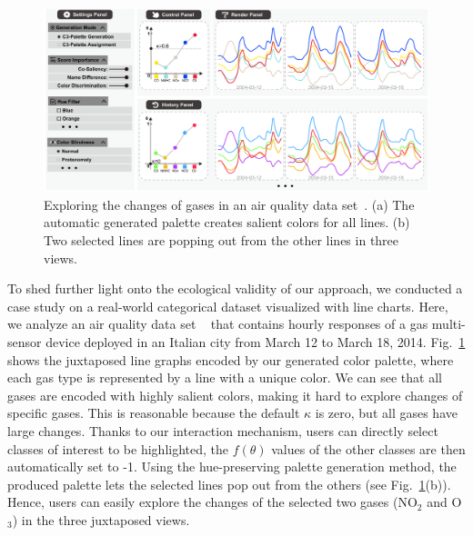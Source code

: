 \begin{figure}[!t]
\centering
\includegraphics[width=1\linewidth]{figures/case-linechart-2.pdf}
\caption{Exploring the changes of gases in an air quality data set~\cite{DEVITO2008750}. (a) The automatic generated palette creates salient colors for  all lines. (b) Two selected lines are popping out from the other lines in three views.}
\vspace*{-3mm}
\label{fig:caseStudy2}
\end{figure}

To shed further light onto the ecological validity of our approach, we conducted a case study on a real-world categorical dataset visualized with line charts.
Here, we analyze an air quality data set ~\cite{DEVITO2008750} that contains hourly responses of a gas multi-sensor device deployed in an Italian city from March 12 to March 18, 2014.
Fig.~\ref{fig:caseStudy2} shows the juxtaposed line graphs encoded by our generated color palette, where each gas type is represented by a line with a unique color.
We can see that all gases are encoded with highly salient colors, making it hard to explore changes of specific gases. This is reasonable because the default $\kappa$ is zero, but all gases have large changes.
Thanks to our interaction mechanism, users can directly select classes of interest to be highlighted,  the $f(\theta)$ values of the other classes are then automatically set to -1. Using the hue-preserving palette generation method, the produced palette lets the selected lines pop out from the others (see Fig.~\ref{fig:caseStudy2}(b)). Hence, users can easily explore the changes of the selected two gases (NO$_2$ and O$_3$) in the three juxtaposed views.



